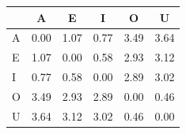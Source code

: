 \begin{tabular}{lccccc}
\toprule
\rowcolor{col01}
 & A & E & I & O & U \\
\midrule
A & 0.00 & 1.07 & 0.77 & 3.49 & 3.64 \\
E & 1.07 & 0.00 & 0.58 & 2.93 & 3.12 \\
I & 0.77 & 0.58 & 0.00 & 2.89 & 3.02 \\
O & 3.49 & 2.93 & 2.89 & 0.00 & 0.46 \\
U & 3.64 & 3.12 & 3.02 & 0.46 & 0.00 \\
\bottomrule
\end{tabular}

